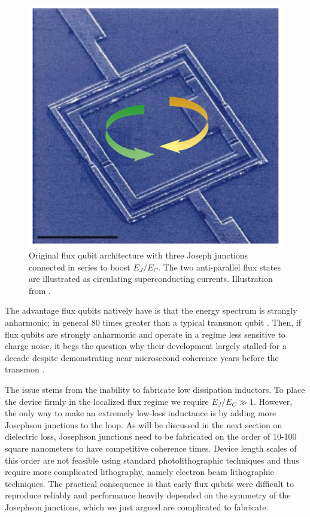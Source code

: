 \documentclass[%
 reprint,
showpacs,
 amsmath,amssymb,
 aps,
longbibliography,
]{revtex4-1}
\begin{document}
\begin{figure}[h!]
  \includegraphics[width=\linewidth]{wilhelm_ckt.png}
  \caption{Original flux qubit architecture with three Joseph junctions connected in series to boost $E_J/E_C$. The two anti-parallel flux states are illustrated as circulating superconducting currents. Illustration from \cite{Wilhelm}.}
  \label{fig:fluxqubit}
\end{figure}
The advantage flux qubits natively have is that the energy spectrum is strongly anharmonic; in general 80 times greater than a typical transmon qubit \cite{birenbaum}. Then, if flux qubits are strongly anharmonic and operate in a regime less sensitive to charge noise, it begs the question why their development largely stalled for a decade despite demonstrating near microsecond coherence years before the transmon \cite{microsecond_fluxqubit}.

The issue stems from the inability to fabricate low dissipation inductors. To place the device firmly in the localized flux regime we require $E_J/E_C \gg 1$. However, the only way to make an extremely low-loss inductance is by adding more Josephson junctions to the loop. As will be discussed in the next section on dielectric loss, Josephson junctions need to be fabricated on the order of 10-100 square nanometers to have competitive coherence times. Device length scales of this order are not feasible using standard photolithographic techniques and thus require more complicated lithography, namely electron beam lithographic techniques. The practical consequence is that early flux qubits were difficult to reproduce reliably and performance heavily depended on the symmetry of the Josephson junctions\cite{birenbaum}, which we just argued are complicated to fabricate.
\end{document}
